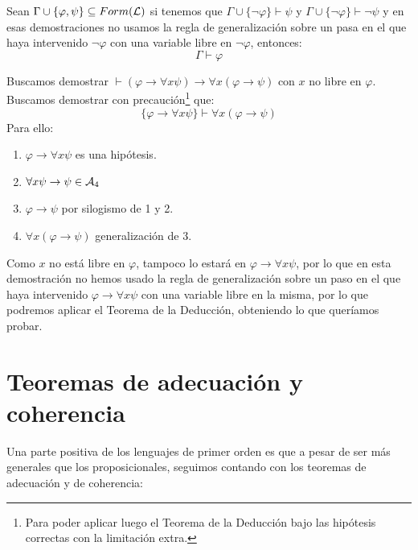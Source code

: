 \begin{teo}
    Sean $\Gamma\cup\{\varphi,\psi\}\subseteq Form(\mathcal{L})$ si tenemos que $\Gamma\cup\{\lnot\varphi\}\vdash \psi$ y $\Gamma\cup\{\lnot\varphi\}\vdash \lnot\psi$ y en esas demostraciones no usamos la regla de generalización sobre un pasa en el que haya intervenido $\lnot\varphi$ con una variable libre en $\lnot\varphi$, entonces:
    \begin{equation*}
        \Gamma\vdash \varphi
    \end{equation*}
\end{teo}

\begin{ejemplo}
    Buscamos demostrar $\vdash (\varphi \to \forall x\psi)\to \forall x(\varphi\to \psi)$ con $x$ no libre en $\varphi$.\\

        Buscamos demostrar con precaución\footnote{Para poder aplicar luego el Teorema de la Deducción bajo las hipótesis correctas con la limitación extra.} que:
        \begin{equation*}
            \{\varphi \to \forall x\psi\} \vdash \forall x(\varphi\to \psi)
        \end{equation*}
        Para ello:
        \begin{enumerate}
            \item $\varphi \to \forall x\psi$ es una hipótesis.
            \item $\forall x\psi\to \psi \in \mathcal{A}_4$
            \item $\varphi\to \psi$ por silogismo de 1 y 2.
            \item $\forall x(\varphi\to \psi)$ generalización de $3$.
        \end{enumerate}

        Como $x$ no está libre en $\varphi$, tampoco lo estará en $\varphi\to\forall x\psi$, por lo que en esta demostración no hemos usado la regla de generalización sobre un paso en el que haya intervenido $\varphi\to\forall x\psi$ con una variable libre en la misma, por lo que podremos aplicar el Teorema de la Deducción, obteniendo lo que queríamos probar.
\end{ejemplo}

\section{Teoremas de adecuación y coherencia}
Una parte positiva de los lenguajes de primer orden es que a pesar de ser más generales que los proposicionales, seguimos contando con los teoremas de adecuación y de coherencia:

